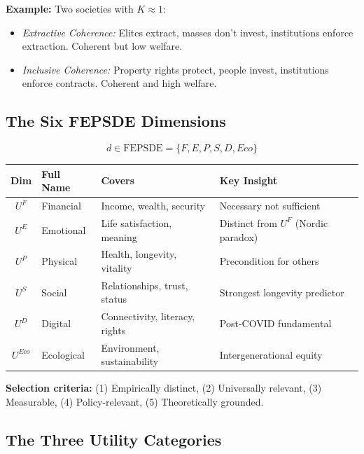 \textbf{Example:} Two societies with $K \approx 1$:
\begin{itemize}[nosep]
\item \textit{Extractive Coherence:} Elites extract, masses don't invest, institutions enforce extraction. Coherent but low welfare.
\item \textit{Inclusive Coherence:} Property rights protect, people invest, institutions enforce contracts. Coherent and high welfare.
\end{itemize}

\subsection{The Six FEPSDE Dimensions}

\begin{equation}
\boxed{
d \in \text{FEPSDE} = \{F, E, P, S, D, Eco\}
}
\label{eq:mp-fepsde-dims}
\end{equation}

\begin{center}
\renewcommand{\arraystretch}{1.2}
\small
\begin{tabular}{@{}clll@{}}
\toprule
\textbf{Dim} & \textbf{Full Name} & \textbf{Covers} & \textbf{Key Insight} \\
\midrule
$U^F$ & Financial & Income, wealth, security & Necessary not sufficient \\
$U^E$ & Emotional & Life satisfaction, meaning & Distinct from $U^F$ (Nordic paradox) \\
$U^P$ & Physical & Health, longevity, vitality & Precondition for others \\
$U^S$ & Social & Relationships, trust, status & Strongest longevity predictor \\
$U^D$ & Digital & Connectivity, literacy, rights & Post-COVID fundamental \\
$U^{Eco}$ & Ecological & Environment, sustainability & Intergenerational equity \\
\bottomrule
\end{tabular}
\end{center}

\textbf{Selection criteria:} (1) Empirically distinct, (2) Universally relevant, (3) Measurable, (4) Policy-relevant, (5) Theoretically grounded.

\subsection{The Three Utility Categories}

